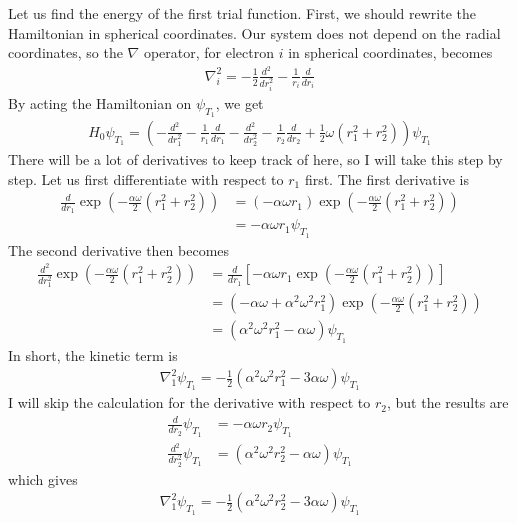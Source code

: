 \documentclass[12pt]{article}
\begin{document}
Let us find the energy of the first trial function. First, we should rewrite the Hamiltonian in spherical coordinates. Our system does not depend on the radial coordinates, so the $\nabla$ operator, for electron $i$ in spherical coordinates, becomes
\begin{align*}
\nabla^2_i = -\frac{1}{2} \frac{d^2}{dr^2_i} - \frac{1}{r_i}\frac{d}{dr_i}
\end{align*}
By acting the Hamiltonian on $\psi_{T_1}$, we get
\begin{align*}
H_0\psi_{T_1} = \left(-\frac{d^2}{dr^2_1} - \frac{1}{r_1}\frac{d}{dr_1} -\frac{d^2}{dr^2_2} - \frac{1}{r_2}\frac{d}{dr_2} + \frac{1}{2}\omega(r_1^2+r_2^2)\right)\psi_{T_1}
\end{align*}
There will be a lot of derivatives to keep track of here, so I will take this step by step. Let us first differentiate with respect to $r_1$ first. The first derivative is
\begin{align*}
\frac{d}{dr_1}\exp\left(-\frac{\alpha \omega}{2}(r^2_1 + r^2_2)\right) &= \left( -\alpha \omega r_1 \right)\exp\left(-\frac{\alpha \omega}{2}(r^2_1 + r^2_2)\right) \\
&= -\alpha \omega r_1 \psi_{T_1}
\end{align*}
The second derivative then becomes
\begin{align*}
\frac{d^2}{dr_1^2}\exp\left(-\frac{\alpha \omega}{2}(r^2_1 + r^2_2)\right) &= \frac{d}{dr_1}\left[-\alpha \omega r_1 \exp\left(-\frac{\alpha \omega}{2}(r^2_1 + r^2_2)\right)\right]\\
&= (-\alpha \omega + \alpha^2 \omega^2 r_1^2)\exp\left(-\frac{\alpha \omega}{2}(r^2_1 + r^2_2)\right) \\
&= (\alpha^2 \omega^2 r_1^2 - \alpha \omega)\psi_{T_1}
\end{align*}
In short, the kinetic term is
\begin{align}
\nabla_1^2 \psi_{T_1} =-\frac{1}{2}(\alpha^2\omega^2r_1^2 -3 \alpha \omega)\psi_{T_1}
\label{eq:Kinetic_psi1}
\end{align}
I will skip the calculation for the derivative with respect to $r_2$, but the results are
\begin{align*}
\frac{d}{dr_2}\psi_{T_1} &=  -\alpha \omega r_2 \psi_{T_1} \\
\frac{d^2}{dr_2^2}\psi_{T_1} &= (\alpha^2 \omega^2 r_2^2 - \alpha \omega)\psi_{T_1}
\end{align*}
which gives
\begin{align*}
\nabla_1^2 \psi_{T_1} =-\frac{1}{2}(\alpha^2\omega^2r_2^2 -3 \alpha \omega)\psi_{T_1}
\end{align*}
\end{document}

